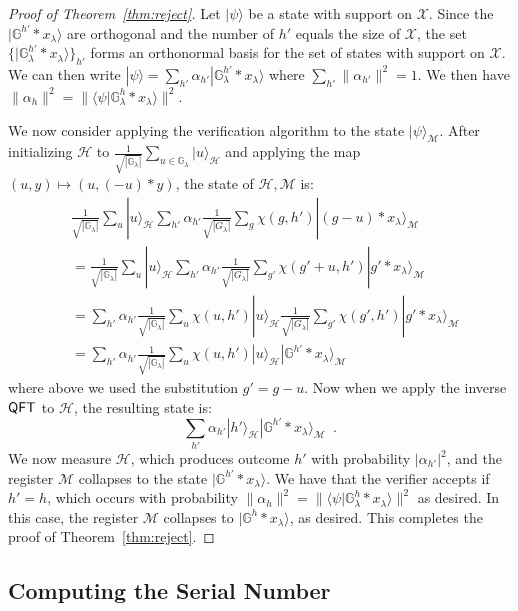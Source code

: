 \documentclass{article}\usepackage[a4paper,margin=20mm]{geometry}
\numberwithin{theorem}{section}
\numberwithin{equation}{section}
\newcommand{\G}{\mathbb{G}}
\newcommand{\Hs}{{\mathcal{H}}}
\newcommand{\Ms}{{\mathcal{M}}}
\newcommand{\Xs}{{\mathcal{X}}}
\newcommand{\QFT}{{\sf QFT}}
\begin{document}
\begin{proof}[Proof of Theorem~\ref{thm:reject}]
Let $|\psi\rangle$ be a state with support on $\Xs$. Since the $|\G^{h'}*x_\lambda\rangle$ are orthogonal and the number of $h'$ equals the size of $\Xs$, the set $\{|\G_\lambda^{h'}*x_\lambda\rangle\}_{h'}$ forms an orthonormal basis for the set of states with support on $\Xs$. We can then write $|\psi\rangle=\sum_{h'}\alpha_{h'}|\G_\lambda^{h'}*x_\lambda\rangle$ where $\sum_{h'} \|\alpha_{h'}\|^2=1$. We then have $\|\alpha_h\|^2=\|\langle\psi |\G_\lambda^h*x_\lambda\rangle\|^2$.

We now consider applying the verification algorithm to the state $|\psi\rangle_\Ms$. After initializing $\Hs$ to $\frac{1}{\sqrt{|\G_\lambda|}}\sum_{u\in\G_\lambda}|u\rangle_\Hs$ and applying the map $(u,y)\mapsto (u,(-u)*y)$, the state of $\Hs,\Ms$ is:
\begin{align*}&\frac{1}{\sqrt{|\G_\lambda|}}\sum_{u}|u\rangle_\Hs \sum_{h'}\alpha_{h'} \frac{1}{\sqrt{|G_\lambda|}}\sum_g \chi(g,h') |(g-u)*x_\lambda\rangle_\Ms\\
	&=\frac{1}{\sqrt{|\G_\lambda|}}\sum_{u}|u\rangle_\Hs \sum_{h'}\alpha_{h'}\frac{1}{\sqrt{|G_\lambda|}}\sum_{g'} \chi(g'+u,h') |g'*x_\lambda\rangle_\Ms\\
	&=\sum_{h'}\alpha_{h'} \frac{1}{\sqrt{|\G_\lambda|}}\sum_u \chi(u,h')|u\rangle_\Hs \frac{1}{\sqrt{|G_\lambda|}} \sum_{g'}\chi(g',h')|g'*x_\lambda\rangle_\Ms\\
	&=\sum_{h'}\alpha_{h'} \frac{1}{\sqrt{|\G_\lambda|}}\sum_u \chi(u,h')|u\rangle_\Hs |\G^{h'}*x_\lambda\rangle_\Ms
\end{align*}
where above we used the substitution $g'=g-u$. Now when we apply the inverse $\QFT$ to $\Hs$, the resulting state is:
\[\sum_{h'}\alpha_{h'} |h'\rangle_\Hs |\G^{h'}*x_\lambda\rangle_\Ms\enspace .\]
We now measure $\Hs$, which produces outcome $h'$ with probability $|\alpha_{h'}|^2$, and the register $\Ms$ collapses to the state $|\G^{h'}*x_\lambda\rangle$. We have that the verifier accepts if $h'=h$, which occurs with probability $\|\alpha_h\|^2=\|\langle\psi |\G_\lambda^h*x_\lambda\rangle\|^2$ as desired. In this case, the register $\Ms$ collapses to $|\G^{h}*x_\lambda\rangle$, as desired. This completes the proof of Theorem~\ref{thm:reject}.
\end{proof}





\subsection{Computing the Serial Number}\label{sec:compserial}
\end{document}
